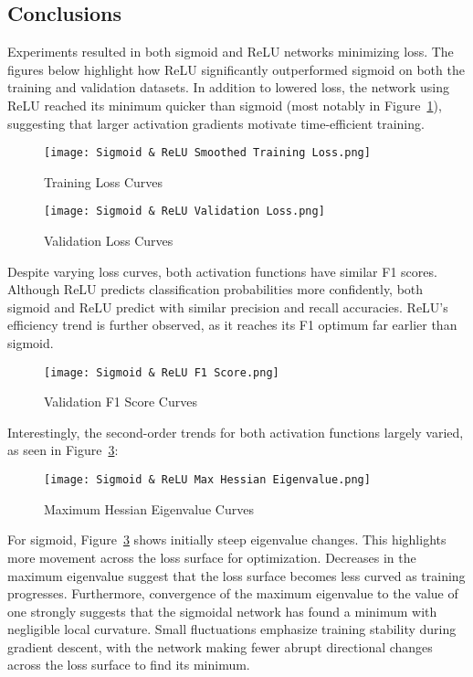 \documentclass{article}
\theoremstyle{definition}
\begin{document}
\subsection{Conclusions}
\label{sec:conclusion}
Experiments resulted in both sigmoid and ReLU networks minimizing loss. The figures below highlight how ReLU significantly outperformed sigmoid on both the training and validation datasets. In addition to lowered loss, the network using ReLU reached its minimum quicker than sigmoid (most notably in Figure~\ref{fig:Figure 7}), suggesting that larger activation gradients motivate time-efficient training.
\begin{figure}[H]
    \centering
    \begin{minipage}{0.5\textwidth}
        \centering
        \texttt{[image: Sigmoid \& ReLU Smoothed Training Loss.png]} %
        \caption{Training Loss Curves}
        \label{fig:Figure 6}
    \end{minipage}\hfill
    \begin{minipage}{0.5\textwidth}
        \centering
        \texttt{[image: Sigmoid \& ReLU Validation Loss.png]} %
        \caption{Validation Loss Curves}
        \label{fig:Figure 7}
    \end{minipage}
\end{figure}
Despite varying loss curves, both activation functions have similar F1 scores. Although ReLU predicts classification probabilities more confidently, both sigmoid and ReLU predict with similar precision and recall accuracies. ReLU's efficiency trend is further observed, as it reaches its F1 optimum far earlier than sigmoid.
\begin{figure}[H]
    \centering
    \texttt{[image: Sigmoid \& ReLU F1 Score.png]} %
    \caption{Validation F1 Score Curves}
    \label{fig:Figure 8}
\end{figure}
Interestingly, the second-order trends for both activation functions largely varied, as seen in Figure~\ref{fig:Figure 9}:
\begin{figure}[H]
    \centering
    \texttt{[image: Sigmoid \& ReLU Max Hessian Eigenvalue.png]} %
    \caption{Maximum Hessian Eigenvalue Curves}
    \label{fig:Figure 9}
\end{figure}
For sigmoid, Figure~\ref{fig:Figure 9} shows initially steep eigenvalue changes. This highlights more movement across the loss surface for optimization. Decreases in the maximum eigenvalue suggest that the loss surface becomes less curved as training progresses. Furthermore, convergence of the maximum eigenvalue to the value of one strongly suggests that the sigmoidal network has found a minimum with negligible local curvature. Small fluctuations emphasize training stability during gradient descent, with the network making fewer abrupt directional changes across the loss surface to find its minimum.
\end{document}
